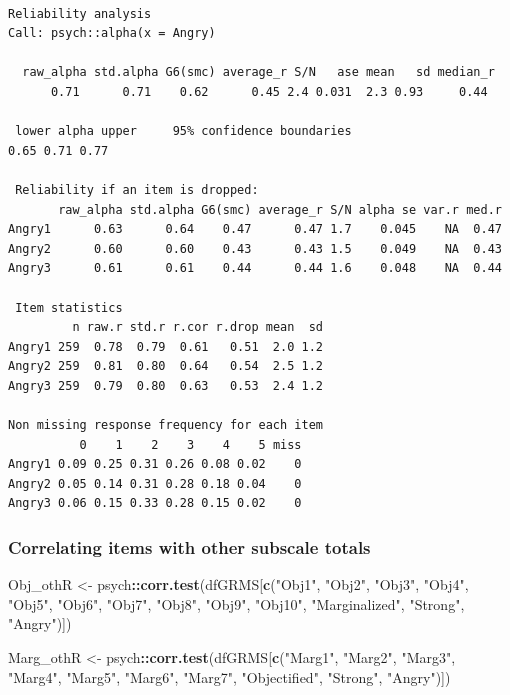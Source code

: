 \documentclass[
  english,
]{book}
\newenvironment{Shaded}{\begin{snugshade}}{\end{snugshade}}
\newcommand{\KeywordTok}[1]{\textcolor[rgb]{0.13,0.29,0.53}{\textbf{#1}}}
\newcommand{\NormalTok}[1]{#1}
\newcommand{\OperatorTok}[1]{\textcolor[rgb]{0.81,0.36,0.00}{\textbf{#1}}}
\newcommand{\StringTok}[1]{\textcolor[rgb]{0.31,0.60,0.02}{#1}}
\begin{document}
\begin{verbatim}

Reliability analysis   
Call: psych::alpha(x = Angry)

  raw_alpha std.alpha G6(smc) average_r S/N   ase mean   sd median_r
      0.71      0.71    0.62      0.45 2.4 0.031  2.3 0.93     0.44

 lower alpha upper     95% confidence boundaries
0.65 0.71 0.77 

 Reliability if an item is dropped:
       raw_alpha std.alpha G6(smc) average_r S/N alpha se var.r med.r
Angry1      0.63      0.64    0.47      0.47 1.7    0.045    NA  0.47
Angry2      0.60      0.60    0.43      0.43 1.5    0.049    NA  0.43
Angry3      0.61      0.61    0.44      0.44 1.6    0.048    NA  0.44

 Item statistics 
         n raw.r std.r r.cor r.drop mean  sd
Angry1 259  0.78  0.79  0.61   0.51  2.0 1.2
Angry2 259  0.81  0.80  0.64   0.54  2.5 1.2
Angry3 259  0.79  0.80  0.63   0.53  2.4 1.2

Non missing response frequency for each item
          0    1    2    3    4    5 miss
Angry1 0.09 0.25 0.31 0.26 0.08 0.02    0
Angry2 0.05 0.14 0.31 0.28 0.18 0.04    0
Angry3 0.06 0.15 0.33 0.28 0.15 0.02    0
\end{verbatim}

\hypertarget{correlating-items-with-other-subscale-totals}{%
\subsubsection{Correlating items with other subscale totals}\label{correlating-items-with-other-subscale-totals}}

\begin{Shaded}
\begin{Highlighting}[]
\NormalTok{Obj_othR <-}\StringTok{ }\NormalTok{psych}\OperatorTok{::}\KeywordTok{corr.test}\NormalTok{(dfGRMS[}\KeywordTok{c}\NormalTok{(}\StringTok{"Obj1"}\NormalTok{, }\StringTok{"Obj2"}\NormalTok{, }\StringTok{"Obj3"}\NormalTok{, }\StringTok{"Obj4"}\NormalTok{, }\StringTok{"Obj5"}\NormalTok{, }\StringTok{"Obj6"}\NormalTok{, }\StringTok{"Obj7"}\NormalTok{, }\StringTok{"Obj8"}\NormalTok{, }\StringTok{"Obj9"}\NormalTok{, }\StringTok{"Obj10"}\NormalTok{, }\StringTok{"Marginalized"}\NormalTok{, }\StringTok{"Strong"}\NormalTok{, }\StringTok{"Angry"}\NormalTok{)])}
\end{Highlighting}
\end{Shaded}

\begin{Shaded}
\begin{Highlighting}[]
\NormalTok{Marg_othR <-}\StringTok{ }\NormalTok{psych}\OperatorTok{::}\KeywordTok{corr.test}\NormalTok{(dfGRMS[}\KeywordTok{c}\NormalTok{(}\StringTok{"Marg1"}\NormalTok{, }\StringTok{"Marg2"}\NormalTok{, }\StringTok{"Marg3"}\NormalTok{, }\StringTok{"Marg4"}\NormalTok{, }\StringTok{"Marg5"}\NormalTok{, }\StringTok{"Marg6"}\NormalTok{, }\StringTok{"Marg7"}\NormalTok{, }\StringTok{"Objectified"}\NormalTok{, }\StringTok{"Strong"}\NormalTok{, }\StringTok{"Angry"}\NormalTok{)])}
\end{Highlighting}
\end{Shaded}
\end{document}
